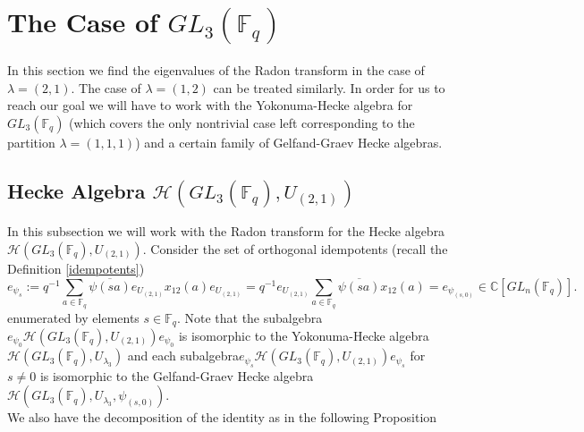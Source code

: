 \documentclass[12pt,reqno]{amsart}
\theoremstyle{definition}
\theoremstyle{remark}
\numberwithin{equation}{section}
\newcommand{\CC}{\mathbb{C}}
\newcommand{\GL}[1]{GL_{#1}(\mathbb{F}_q)}
\begin{document}
\section{The Case of $\GL{3}$}

In this section we find the eigenvalues of the Radon transform in the case of $\lambda=(2,1)$. The case of $\lambda=(1,2)$ can be treated similarly. In order for us to reach our goal we will have to work with the Yokonuma-Hecke algebra for $\GL{3}$ (which covers the only nontrivial case left corresponding to the partition $\lambda=(1,1,1)$) and a certain family of Gelfand-Graev Hecke algebras.\\


\subsection{Hecke Algebra $\mathcal{H}(\GL{3},U_{(2,1)})$}

In this subsection we will work with the Radon transform for the Hecke algebra $\mathcal{H}(\GL{3},U_{(2,1)})$. Consider the set of orthogonal idempotents (recall the Definition \ref{idempotents})
\begin{equation*}
    e_{\psi_s}:= q^{-1}\sum_{a\in \mathbb{F}_q} \overline{\psi(sa)} e_{U_{(2,1)}} x_{12}(a)e_{U_{(2,1)}}=q^{-1}e_{U_{(2,1)}}\sum_{a\in \mathbb{F}_q} \overline{\psi(sa)} x_{12}(a)=e_{\psi_{(s,0)}} \in \CC[\GL{n}].
\end{equation*}
enumerated by elements $s\in \mathbb{F}_q$. Note that the subalgebra $e_{\psi_0}\mathcal{H}(\GL{3},U_{(2,1)})e_{\psi_0}$ is isomorphic to the Yokonuma-Hecke algebra $\mathcal{H}(\GL{3},U_{\lambda_3})$ and each subalgebra\linebreak $e_{\psi_s}\mathcal{H}(\GL{3},U_{(2,1)})e_{\psi_s}$ for $s\neq 0$ is isomorphic to the Gelfand-Graev Hecke algebra $\mathcal{H}(\GL{3},U_{\lambda_3},\psi_{(s,0)})$.\\


We also have the decomposition of the identity as in the following Proposition 


\end{document}
